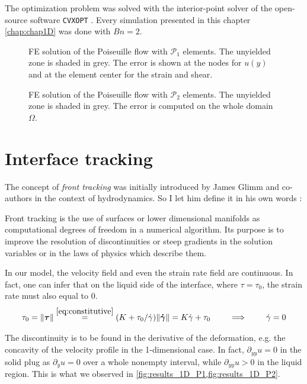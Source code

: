 \documentclass[11 pt]{report}
\begin{document}
The optimization problem was solved with the interior-point solver of the open-source software \texttt{CVXOPT} \cite{cvxopt}. Every simulation presented in this chapter \cref{chap:chap1D} was done with $Bn=2$.

\begin{figure}
    \centering
    
    \caption{FE solution of the Poiseuille flow with $\mathcal{P}_1$ elements. The unyielded zone is shaded in grey. The error is shown at the nodes for $u(y)$ and at the element center for the strain and shear.}
    \label{fig:results_1D_P1}
\end{figure}

\begin{figure}
    \centering
    
    \caption{FE solution of the Poiseuille flow with $\mathcal{P}_2$ elements. The unyielded zone is shaded in grey. The error is computed on the whole domain $\Omega$.}
    \label{fig:results_1D_P2}
\end{figure}


\section{Interface tracking}

The concept of \textit{front tracking} was initially introduced by James Glimm and co-authors \cite{chern1986front} in the context of hydrodynamics. So I let him define it in his own words \cite{SHE2016383}:
\begin{displayquote}
    Front tracking is the use of surfaces or lower dimensional manifolds as computational degrees of freedom in a numerical algorithm. Its purpose is to improve the resolution of discontinuities or steep gradients in the solution variables or in the laws of physics which describe them.
\end{displayquote}

In our model, the velocity field and even the strain rate field are continuous. In fact, one can infer that on the liquid side of the interface, where $\tau=\tau_0$, the strain rate must also equal to $0$.
\begin{equation}
    \tau_0 = \|\boldsymbol \tau\| \stackrel{\eqref{eq:constitutive}}{=} (K + \tau_0 / \dot \gamma) \|\boldsymbol{\dot \gamma}\| = K \dot \gamma + \tau_0 \qquad \implies \qquad \dot \gamma = 0
\end{equation}

The discontinuity is to be found in the derivative of the deformation, e.g. the concavity of the velocity profile in the 1-dimensional case. In fact, $\partial_{yy} u = 0$ in the solid plug as $\partial_y u = 0$ over a whole nonempty interval, while $\partial_{yy} u > 0$ in the liquid region. This is what we observed in \cref{fig:results_1D_P1,fig:results_1D_P2}.
\end{document}
